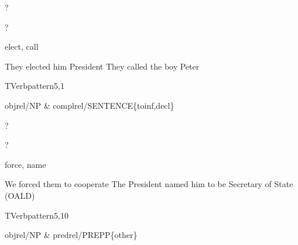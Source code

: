 
\begin{thetadescr}
\evitem  ?
\esitem
     \begin{examples}
        \example   ?
     \end{examples}
\end{thetadescr}



\begin{thetadescr}
\evitem  elect, call
\esitem
     \begin{examples}
        \example They elected him President
        \example They called the boy Peter
     \end{examples}
\end{thetadescr}


\newpage
{}
\begin{vpattern}
 TVerbpattern5,1   
\csritem \mbox{}\\
     \begin{csr}
       objrel/NP & complrel/SENTENCE\{toinf,decl\} 
     \end{csr}
\remarksitem
\end{vpattern}


\begin{thetadescr}
\evitem ?
\esitem
     \begin{examples}
        \example  ?
     \end{examples}
\end{thetadescr}



\begin{thetadescr}
\evitem  force, name
\esitem
     \begin{examples}
        \example We forced them to cooperate
        \example The President named him to be Secretary of State (OALD)
     \end{examples}
\end{thetadescr}


\newpage
{}
\begin{vpattern}
 TVerbpattern5,10
\csritem \mbox{}\\
     \begin{csr}
       objrel/NP & predrel/PREPP\{other\} 
     \end{csr}
\remarksitem
\end{vpattern}

